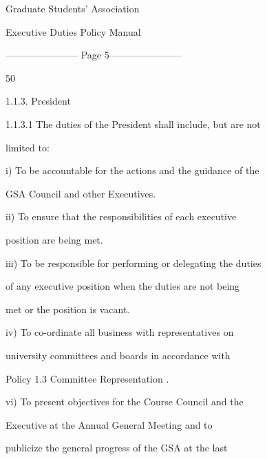                           Graduate Students’ Association  

                          Executive Duties Policy Manual  

  


----------------------- Page 5-----------------------

                  50%

  

1.1.3. President  

  

1.1.3.1           The  duties  of  the  President  shall  include,  but  are  not  

         limited to:   

  

         i)       To be accountable for the actions and the guidance of the  

                  GSA Council and other Executives.  

  

         ii)      To  ensure  that  the  responsibilities  of  each  executive  

                  position are being met.   

  

         iii)     To be responsible for performing or delegating the duties  



                  of any executive position when the duties are not being  



                  met or the position is vacant.   

  

         iv)      To   co-ordinate   all   business   with   representatives   on  



                  university  committees  and  boards  in  accordance  with  



                  Policy 1.3 Committee Representation .   



         vi)      To  present  objectives  for  the  Course  Council  and  the  

                  Executive        at    the    Annual       General       Meeting        and     to  

                  publicize  the  general  progress  of  the  GSA  at  the  last  

